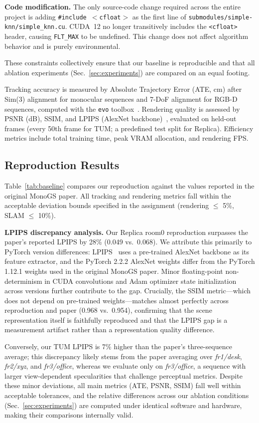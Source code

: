 \documentclass[conference]{IEEEtran}
\begin{document}
\textbf{Code modification.}
The only source-code change required across the entire project is adding \texttt{\#include $<$cfloat$>$} as the first line of \texttt{submodules/simple-knn/simple\_knn.cu}.
CUDA~12 no longer transitively includes the \texttt{<cfloat>} header, causing \texttt{FLT\_MAX} to be undefined.
This change does not affect algorithm behavior and is purely environmental.

These constraints collectively ensure that our baseline is reproducible and that all ablation experiments (Sec.~\ref{sec:experiments}) are compared on an equal footing.

Tracking accuracy is measured by Absolute Trajectory Error (ATE, cm) after Sim(3) alignment for monocular sequences and 7-DoF alignment for RGB-D sequences, computed with the \texttt{evo} toolbox~\cite{evo}.
Rendering quality is assessed by PSNR (dB), SSIM, and LPIPS (AlexNet backbone)~\cite{lpips}, evaluated on held-out frames (every 50th frame for TUM; a predefined test split for Replica).
Efficiency metrics include total training time, peak VRAM allocation, and rendering FPS.

\subsection{Reproduction Results}

Table~\ref{tab:baseline} compares our reproduction against the values reported in the original MonoGS paper.
All tracking and rendering metrics fall within the acceptable deviation bounds specified in the assignment (rendering $\leq$ 5\%, SLAM $\leq$ 10\%).

\textbf{LPIPS discrepancy analysis.}
Our Replica room0 reproduction surpasses the paper's reported LPIPS by 28\% (0.049 vs.~0.068).
We attribute this primarily to PyTorch version differences: LPIPS~\cite{lpips} uses a pre-trained AlexNet backbone as its feature extractor, and the PyTorch 2.2.2 AlexNet weights differ from the PyTorch 1.12.1 weights used in the original MonoGS paper.
Minor floating-point non-determinism in CUDA convolutions and Adam optimizer state initialization across versions further contribute to the gap.
Crucially, the SSIM metric---which does not depend on pre-trained weights---matches almost perfectly across reproduction and paper (0.968 vs.~0.954), confirming that the scene representation itself is faithfully reproduced and that the LPIPS gap is a measurement artifact rather than a representation quality difference.

Conversely, our TUM LPIPS is 7\% higher than the paper's three-sequence average; this discrepancy likely stems from the paper averaging over \textit{fr1/desk}, \textit{fr2/xyz}, and \textit{fr3/office}, whereas we evaluate only on \textit{fr3/office}, a sequence with larger view-dependent specularities that challenge perceptual metrics.
Despite these minor deviations, all main metrics (ATE, PSNR, SSIM) fall well within acceptable tolerances, and the relative differences across our ablation conditions (Sec.~\ref{sec:experiments}) are computed under identical software and hardware, making their comparisons internally valid.
\end{document}
